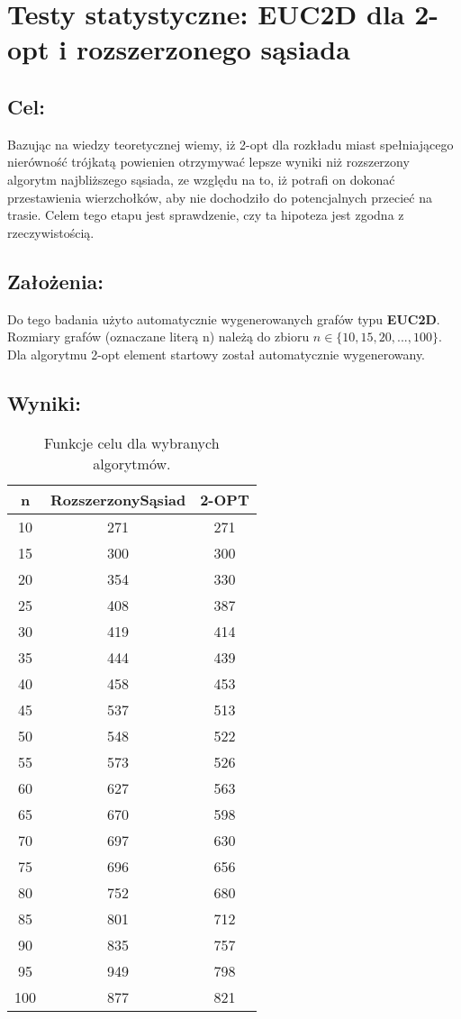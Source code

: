 \section{Testy statystyczne: EUC2D dla 2-opt i rozszerzonego sąsiada}
  \subsection{Cel:}
    Bazując na wiedzy teoretycznej wiemy, iż 2-opt dla rozkładu miast spełniającego nierówność trójkatą powienien otrzymywać lepsze wyniki niż rozszerzony algorytm najbliższego sąsiada, ze względu na to, iż potrafi on dokonać przestawienia wierzchołków, aby nie dochodziło do potencjalnych przecieć na trasie. Celem tego etapu jest sprawdzenie, czy ta hipoteza jest zgodna z rzeczywistością.
  \subsection{Założenia:}
    Do tego badania użyto automatycznie wygenerowanych grafów typu \textbf{EUC2D}. Rozmiary grafów (oznaczane literą n) należą do zbioru $n \in \{10,15,20,...,100\}$. Dla algorytmu 2-opt element startowy został automatycznie wygenerowany.
  \subsection{Wyniki: }


  \begin{table}[H]
    \begin{tabular}{|c | c | c |} 
     \hline
     n & RozszerzonySąsiad & 2-OPT \\ [0.5ex] 
     \hline\hline
      10 & 271 & 271 \\
      15 & 300 & 300 \\
      20 & 354 & 330 \\
      25 & 408 & 387 \\
      30 & 419 & 414 \\
      35 & 444 & 439 \\
      40 & 458 & 453 \\
      45 & 537 & 513 \\
      50 & 548 & 522 \\
      55 & 573 & 526 \\
      60 & 627 & 563 \\
      65 & 670 & 598 \\ 
      70 & 697 & 630 \\
      75 & 696 & 656 \\
      80 & 752 & 680 \\
      85 & 801 & 712 \\
      90 & 835 & 757 \\
      95 & 949 & 798 \\
      100 & 877 & 821 \\

     \hline
    \end{tabular}
    \caption{Funkcje celu dla wybranych algorytmów.}
    \end{table}


